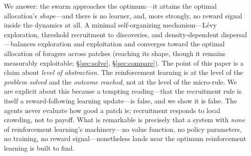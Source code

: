 \documentclass{article}
\begin{document}
We answer: the swarm approaches the optimum---it attains the optimal allocation's \emph{shape}---and there is
no learner, and, more strongly, no reward signal inside the dynamics at all. A minimal
self-organizing mechanism---L\'evy exploration, threshold recruitment to discoveries, and
density-dependent dispersal---balances exploration and exploitation and converges toward the optimal allocation
of foragers across patches (reaching its shape, though it remains measurably exploitable; \S\ref{sec:solve},
\S\ref{sec:compare}). The point of this paper is a claim about \emph{level of
abstraction}. The reinforcement learning is at the level of the \emph{problem solved} and the \emph{outcome
reached}, not at the level of the micro-rule. We are explicit about this because a tempting reading---that the
recruitment rule is itself a reward-following learning update---is false, and we show it is false. The agents
never evaluate how good a patch is; recruitment responds to local crowding, not to payoff. What is remarkable
is precisely that a system with \emph{none} of reinforcement learning's machinery---no value function, no
policy parameters, no training, no reward signal---nonetheless lands near the optimum reinforcement learning is
built to find.
\end{document}
